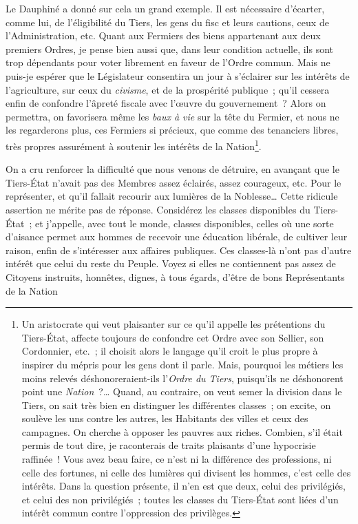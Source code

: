 \documentclass[french,twoside]{book} %
\begin{document}
Le Dauphiné a donné sur cela un grand exemple. Il est nécessaire d’écarter, comme lui, de l’éligibilité du Tiers, les gens du fisc et leurs cautions, ceux de l’Administration, etc. Quant aux Fermiers des biens appartenant aux deux premiers Ordres, je pense bien aussi que, dans leur condition actuelle, ils sont trop dépendants pour voter librement en faveur de l’Ordre commun. Mais ne puis-je espérer que le Législateur consentira un jour à s’éclairer sur les intérêts de l’agriculture, sur ceux du {\itshape civisme}, et de la prospérité publique ; qu’il cessera enfin de confondre l’âpreté fiscale avec l’œuvre du gouvernement ? Alors on permettra, on favorisera même les {\itshape baux à vie} sur la tête du Fermier, et nous ne les regarderons plus, ces Fermiers si précieux, que comme des tenanciers libres, très propres assurément à soutenir les intérêts de la Nation\footnote{Un aristocrate qui veut plaisanter sur ce qu’il appelle les prétentions du Tiers-État, affecte toujours de confondre cet Ordre avec son Sellier, son Cordonnier, etc. ; il choisit alors le langage qu’il croit le plus propre à inspirer du mépris pour les gens dont il parle. Mais, pourquoi les métiers les moins relevés déshonoreraient-ils l’{\itshape Ordre du Tiers}, puisqu’ils ne déshonorent point une {\itshape Nation} ?… Quand, au contraire, on veut semer la division dans le Tiers, on sait très bien en distinguer les différentes classes ; on excite, on soulève les uns contre les autres, les Habitants des villes et ceux des campagnes. On cherche à opposer les pauvres aux riches. Combien, s’il était permis de tout dire, je raconterais de traits plaisants d’une hypocrisie raffinée ! Vous avez beau faire, ce n’est ni la différence des professions, ni celle des fortunes, ni celle des lumières qui divisent les hommes, c’est celle des intérêts. Dans la question présente, il n’en est que deux, celui des privilégiés, et celui des non privilégiés ; toutes les classes du Tiers-État sont liées d’un intérêt commun contre l’oppression des privilèges.}.\par
On a cru renforcer la difficulté que nous venons de détruire, en avançant que le Tiers-État n’avait pas des Membres assez éclairés, assez courageux, etc. Pour le représenter, et qu’il fallait recourir aux lumières de la Noblesse… Cette ridicule assertion ne mérite pas de réponse. Considérez les classes disponibles du Tiers-État ; et j’appelle, avec tout le monde, classes disponibles, celles où une sorte d’aisance permet aux hommes de recevoir une éducation libérale, de cultiver leur raison, enfin de s’intéresser aux affaires publiques. Ces classes-là n’ont pas d’autre intérêt que celui du reste du Peuple. Voyez si elles ne contiennent pas assez de Citoyens instruits, honnêtes, dignes, à tous égards, d’être de bons Représentants de la Nation\par
\end{document}
